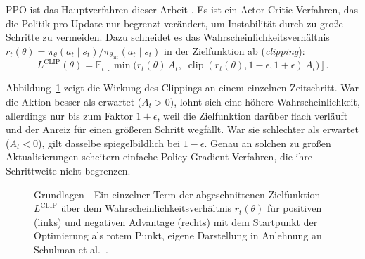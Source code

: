 \documentclass[11pt,a4paper]{article}
\begin{document}
PPO ist das Hauptverfahren dieser Arbeit \cite{schulman2017ppo}. Es ist
ein Actor-Critic-Verfahren, das die Politik pro Update nur begrenzt verändert, um
Instabilität durch zu große Schritte zu vermeiden. Dazu schneidet es das
Wahrscheinlichkeitsverhältnis
$r_t(\theta) = \pi_\theta(a_t\mid s_t)/\pi_{\theta_\text{alt}}(a_t\mid s_t)$
in der Zielfunktion ab (\emph{clipping}):
\[
L^{\text{CLIP}}(\theta) = \mathbb{E}_t\!\left[\min\!\big(r_t(\theta)\,A_t,\;
\operatorname{clip}(r_t(\theta), 1-\epsilon, 1+\epsilon)\,A_t\big)\right].
\]

Abbildung~\ref{fig:ppo_clip} zeigt die Wirkung des Clippings an einem einzelnen
Zeitschritt. War die Aktion besser als erwartet ($A_t > 0$), lohnt sich eine
höhere Wahrscheinlichkeit, allerdings nur bis zum Faktor $1+\epsilon$, weil die
Zielfunktion darüber flach verläuft und der Anreiz für einen größeren Schritt
wegfällt. War sie schlechter als erwartet ($A_t < 0$), gilt dasselbe
spiegelbildlich bei $1-\epsilon$. Genau an solchen zu großen Aktualisierungen
scheitern einfache Policy-Gradient-Verfahren, die ihre Schrittweite nicht
begrenzen.

\begin{figure}[h]
\centering
{}
\caption[Wirkung des PPO-Clippings]{Grundlagen - Ein einzelner Term der
abgeschnittenen Zielfunktion $L^{\text{CLIP}}$ über dem
Wahrscheinlichkeitsverhältnis $r_t(\theta)$ für positiven (links) und negativen
Advantage (rechts) mit dem Startpunkt der Optimierung als rotem Punkt, eigene
Darstellung in Anlehnung an Schulman et al.\ \cite[Abb.~1]{schulman2017ppo}.}
\label{fig:ppo_clip}
\end{figure}
\end{document}
